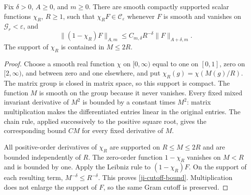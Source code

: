 \begin{lemma}\label{ji-compact-cutoff}
Fix \(\delta>0\), \(A\geq0\), and \(m\geq0\).  There are
smooth compactly supported scalar functions \(\chi_R\), \(R\geq1\),
such that \(\chi_RF\in\mathscr C_\varepsilon\) whenever
\(F\) is smooth and vanishes on \(\mathcal G_r<\varepsilon\),
and
\begin{equation}\label{ji-cutoff-bound}
 \|(1-\chi_R)F\|_{A,m}
                   \leq C_{m,\delta}R^{-\delta}
                                      \|F\|_{A+\delta,m}.
\end{equation}
The support of \(\chi_R\) is contained in \(M\leq2R\).
\end{lemma}

\begin{proof}
Choose a smooth real function \(\chi\) on \([0,\infty)\)
equal to one on \([0,1]\), zero on \([2,\infty)\), and
between zero and one elsewhere, and put
\(\chi_R(g)=\chi(M(g)/R)\).
The matrix group is closed in matrix space, so this support is
compact.  The function \(M\) is smooth on the group because
it never vanishes.  Every fixed mixed invariant derivative of
\(M^2\) is bounded by a constant times \(M^2\): matrix
multiplication makes the differentiated entries linear in the
original entries.  The chain rule, applied successively to the
positive square root, gives the corresponding bound \(CM\)
for every fixed derivative of \(M\).

All positive-order derivatives of \(\chi_R\) are supported
on \(R\leq M\leq2R\) and are bounded independently of
\(R\).  The zero-order function \(1-\chi_R\) vanishes on
\(M<R\) and is bounded by one.  Apply the Leibniz rule to
\((1-\chi_R)F\).  On the support of each resulting term,
\(M^{-\delta}\leq R^{-\delta}\).  This proves
\eqref{ji-cutoff-bound}.  Multiplication does not enlarge the
support of \(F\), so the same Gram cutoff is preserved.
\end{proof}

